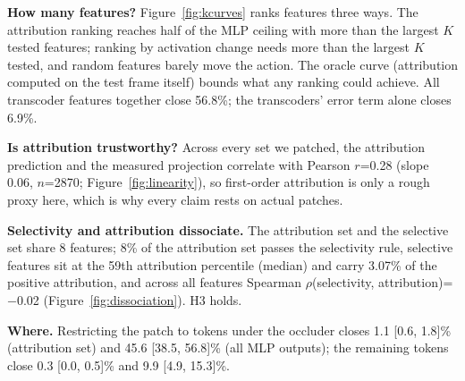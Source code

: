 \documentclass{article}
\begin{document}
\textbf{How many features?} Figure~\ref{fig:kcurves} ranks features three ways. The attribution ranking reaches half of the MLP
ceiling with more than the largest $K$ tested features; ranking by activation change needs
more than the largest $K$ tested, and random features barely move the action. The oracle curve (attribution
computed on the test frame itself) bounds what any ranking could achieve. All transcoder features together close
56.8\%; the transcoders' error term alone closes 6.9\%.

\textbf{Is attribution trustworthy?} Across every set we patched, the attribution prediction and the measured projection correlate
with Pearson $r$=0.28 (slope 0.06, $n$=2870;
Figure~\ref{fig:linearity}), so first-order attribution is only a rough proxy here, which is why every claim rests on actual patches.

\textbf{Selectivity and attribution dissociate.} The attribution set and the selective set share 8
features; 8\% of the attribution set passes the selectivity rule, selective features sit at the
59th attribution percentile (median) and carry 3.07\% of the
positive attribution, and across all features Spearman $\rho$(selectivity, attribution)=$-$0.02
(Figure~\ref{fig:dissociation}). H3 holds.

\textbf{Where.} Restricting the patch to tokens under the occluder closes 1.1 [0.6, 1.8]\% (attribution set) and
45.6 [38.5, 56.8]\% (all MLP outputs); the remaining tokens close 0.3 [0.0, 0.5]\% and
9.9 [4.9, 15.3]\%.
\end{document}
